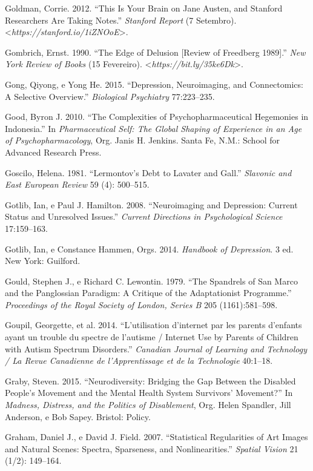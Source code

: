 {\begin{Parskip}
Goldman, Corrie. 2012. ``This Is Your Brain on Jane Austen, and Stanford
Researchers Are Taking Notes.'' \emph{Stanford Report} (7 Setembro).
\textless{}\emph{https://stanford.io/1iZNOoE}\textgreater{}.

Gombrich, Ernst. 1990. ``The Edge of Delusion {[}Review of Freedberg
1989{]}.'' \emph{New York Review of Books} (15 Fevereiro).
\textless{}\emph{https://bit.ly/35ke6Dk}\textgreater{}.

Gong, Qiyong, e Yong He. 2015. ``Depression, Neuroimaging, and
Connectomics: A Selective Overview.'' \emph{Biological Psychiatry}
77:223--235.

Good, Byron J. 2010. ``The Complexities of Psychopharmaceutical
Hegemonies in Indonesia.'' In \emph{Pharmaceutical Self: The Global
Shaping of Experience in an Age of Psychopharmacology}, Org. Janis H.
Jenkins. Santa Fe, N.M.: School for Advanced Research Press.

Goscilo, Helena. 1981. ``Lermontov's Debt to Lavater and Gall.''
\emph{Slavonic and East European Review} 59 (4): 500--515.

Gotlib, Ian, e Paul J. Hamilton. 2008. ``Neuroimaging and Depression:
Current Status and Unresolved Issues.'' \emph{Current Directions in
Psychological Science} 17:159--163.

Gotlib, Ian, e Constance Hammen, Orgs. 2014. \emph{Handbook of
Depression}. 3 ed. New York: Guilford.

Gould, Stephen J., e Richard C. Lewontin. 1979. ``The Spandrels of San
Marco and the Panglossian Paradigm: A Critique of the Adaptationist
Programme.'' \emph{Proceedings of the Royal Society of London, Series B}
205 (1161):581--598.

Goupil, Georgette, et al. 2014. ``L'utilisation d'internet par les
parents d'enfants ayant un trouble du spectre de l'autisme / Internet
Use by Parents of Children with Autism Spectrum Disorders.''
\emph{Canadian Journal of Learning and Technology / La Revue Canadienne
de l'Apprentissage et de la Technologie} 40:1--18.

Graby, Steven. 2015. ``Neurodiversity: Bridging the Gap Between the
Disabled People's Movement and the Mental Health System Survivors'
Movement?'' In \emph{Madness, Distress, and the Politics of
Disablement}, Org. Helen Spandler, Jill Anderson, e Bob Sapey. Bristol:
Policy.

Graham, Daniel J., e David J. Field. 2007. ``Statistical Regularities of
Art Images and Natural Scenes: Spectra, Sparseness, and
Nonlinearities.'' \emph{Spatial Vision} 21 (1/2): 149--164.


\end{Parskip}}
